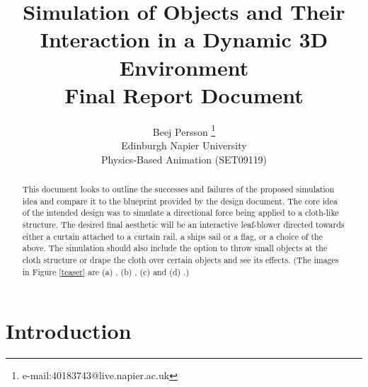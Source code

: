 \documentclass[conference,backref=page]{acmsiggraph}
\title{Simulation of Objects and Their Interaction in a Dynamic 3D Environment\\
	   Final Report Document}
\author{Beej Persson \thanks{e-mail:40183743@live.napier.ac.uk} \\
Edinburgh Napier University\\
Physics-Based Animation (SET09119)}
\begin{document}

\maketitle

\raggedbottom

\begin{abstract}

This document looks to outline the successes and failures of the proposed simulation idea and compare it to the blueprint provided by the design document. The core idea of the intended design was to simulate a directional force being applied to a cloth-like structure. The desired final aesthetic will be an interactive leaf-blower directed towards either a curtain attached to a curtain rail, a ships sail or a flag, or a choice of the above. The simulation should also include the option to throw small objects at the cloth structure or drape the cloth over certain objects and see its effects. (The images in Figure \ref{teaser} are (a) \cite{sail}, (b) \cite{clothmesh}, (c) \cite{flag} and (d) \cite{object}.)

\end{abstract}



\keywordlist





\section{Introduction}


\end{document}
